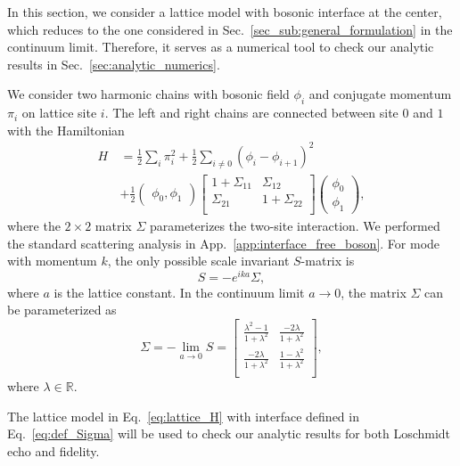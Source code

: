 
In this section, we consider a lattice model with bosonic interface at the center\cite{peschel_exact_2012,calabrese_entanglement_2012}, which reduces to the one considered in Sec.~\ref{sec_sub:general_formulation} in the continuum limit\cite{sakai_entanglement_2008}. Therefore, it serves as a numerical tool to check our analytic results in Sec.~\ref{sec:analytic_numerics}. 


We consider two harmonic chains with bosonic field $\phi_i$ and conjugate momentum $\pi_i$ on lattice site $i$. The left and right chains are connected between site $0$ and $1$ with the Hamiltonian
\begin{equation}
\begin{aligned}
\label{eq:lattice_H}
H &= \frac{1}{2} \sum_i \pi_i^2  +  \frac{1}{2} \sum_{i\ne 0 }  ( \phi_i - \phi_{i+1} )^2 \\
\quad & + \frac{1}{2} \begin{pmatrix}  \phi_0, \phi_1 \end{pmatrix}
\begin{bmatrix}
1 + \Sigma_{11}  & \Sigma_{12} \\
\Sigma_{21} &  1 + \Sigma_{22} \\
\end{bmatrix}
\begin{pmatrix}
\phi_0 \\
\phi_1 
\end{pmatrix},
\end{aligned}
\end{equation}
where the $2\times2$ matrix $\Sigma$ parameterizes the two-site interaction. We performed the standard scattering analysis in App.~\ref{app:interface_free_boson}. For mode with momentum $k$, the only possible scale invariant $S$-matrix is
\begin{equation}
S = - e^{ika} \Sigma,
\end{equation}
where $a$ is the lattice constant. In the continuum limit $a\rightarrow0$, the matrix $\Sigma$ can be parameterized as
\begin{equation}
\label{eq:def_Sigma}
\Sigma = -\lim_{a \rightarrow 0 } S = 
\begin{bmatrix}
\frac{\lambda^2- 1}{1 + \lambda^2} & \frac{-2\lambda }{1 + \lambda^2} \\
\frac{-2\lambda }{1 + \lambda^2} & \frac{1- \lambda^2}{1 + \lambda^2} \\
\end{bmatrix},
\end{equation}
where $\lambda\in\mathbb{R}$. 

The lattice model in Eq.~\eqref{eq:lattice_H} with interface defined in Eq.~\eqref{eq:def_Sigma} will be used to check our analytic results for both Loschmidt echo and fidelity.  


